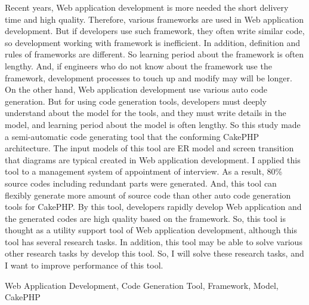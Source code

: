\documentclass{funthesis}
\begin{document}
\maketitle       %

\begin{eabstract}
Recent years, Web application development is more needed the short delivery time and high quality. Therefore, various frameworks are used in Web application development. But if developers use such framework, they often write similar code, so development working with framework is inefficient. In addition,  definition and rules of frameworks are different. So learning period about the framework is often lengthy. And, if engineers who do not know about the framework use the framework, development processes to touch up and modify may will be longer. On the other hand, Web application development use various auto code generation. But for using code generation tools, developers must deeply understand about the model for the tools, and they must write details in the model, and learning period about the model is often lengthy. So this study made a semi-automatic code generating tool that the conforming CakePHP architecture. The input models of this tool are ER model and screen transition that diagrams are typical created in Web application development.  I applied this tool to a management system of appointment  of interview. As a result, 80\% source codes including redundant parts were generated. And, this tool can flexibly generate more amount of source code than other auto code generation tools for CakePHP. By this tool, developers rapidly develop Web application and the generated codes are high quality based on the framework. So, this tool is thought as a utility support tool of Web application development, although this tool has several research tasks. In addition, this tool may be able to solve various other research tasks by develop this tool. So, I will solve these research tasks, and I want to improve performance of this tool.

\end{eabstract}

\begin{ekeyword}
Web Application Development, Code Generation Tool, Framework, Model, CakePHP
\end{ekeyword}
\end{document}
